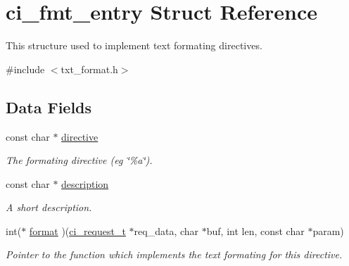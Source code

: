 \hypertarget{structci__fmt__entry}{
\section{ci\_\-fmt\_\-entry Struct Reference}
\label{structci__fmt__entry}
}


This structure used to implement text formating directives.  


{\ttfamily \#include $<$txt\_\-format.h$>$}\subsection*{Data Fields}
\begin{DoxyCompactItemize}
\item 
\hypertarget{structci__fmt__entry_af9dc3c02fb6788006872eb8e4ad5c17d}{
const char $\ast$ \hyperlink{structci__fmt__entry_af9dc3c02fb6788006872eb8e4ad5c17d}{directive}}
\label{structci__fmt__entry_af9dc3c02fb6788006872eb8e4ad5c17d}

\begin{DoxyCompactList}\small\item\em The formating directive (eg \char`\"{}\%a\char`\"{}). \item\end{DoxyCompactList}\item 
\hypertarget{structci__fmt__entry_a96396753033e89fd0383ac6a33f8784b}{
const char $\ast$ \hyperlink{structci__fmt__entry_a96396753033e89fd0383ac6a33f8784b}{description}}
\label{structci__fmt__entry_a96396753033e89fd0383ac6a33f8784b}

\begin{DoxyCompactList}\small\item\em A short description. \item\end{DoxyCompactList}\item 
int($\ast$ \hyperlink{structci__fmt__entry_a7b7b8a391dd2f76a9f5e3262712a75a6}{format} )(\hyperlink{group__REQUEST_ga27da5c4ae491f527ce36901c2e78ea04}{ci\_\-request\_\-t} $\ast$req\_\-data, char $\ast$buf, int len, const char $\ast$param)
\begin{DoxyCompactList}\small\item\em Pointer to the function which implements the text formating for this directive. \item\end{DoxyCompactList}\end{DoxyCompactItemize}


